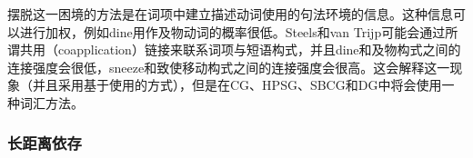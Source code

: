摆脱这一困境的方法是在词项中建立描述动词使用的句法环境的信息。这种信息可以进行加权，例如dine用作及物动词的概率很低。Steels和van Trijp可能会通过所谓共用（coapplication）链接来联系词项与短语构式，并且dine和及物构式之间的连接强度会很低，sneeze和致使移动构式之间的连接强度会很高。这会解释这一现象（并且采用基于使用的方式），但是在CG、HPSG、SBCG和DG中将会使用一种词汇方法。

\subsubsection{长距离依存}
\label{sec-fcg-nld}

